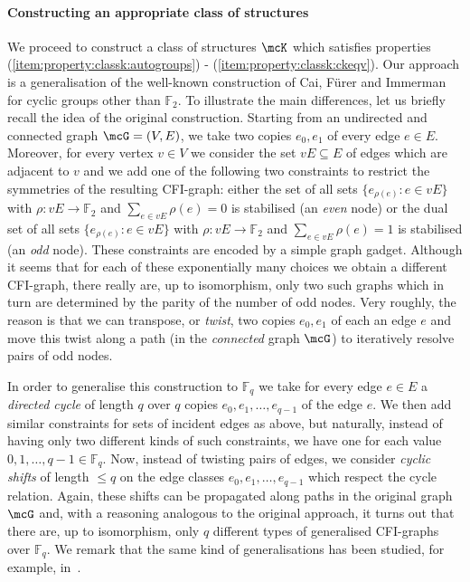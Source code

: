 \documentclass[a4paper,UKenglish]{lipics}
\newcommand{\field}[1]{\mathbb{#1}}
\theoremstyle{plain}
\begin{document}
\paragraph*{Constructing an appropriate class of structures}
We proceed to construct a class of structures $\mcK$ which satisfies 
properties (\ref{item:property:classk:autogroups}) - 
(\ref{item:property:classk:ckeqv}).
Our approach is a generalisation of the well-known construction of Cai, Fürer 
and Immerman~\cite{CFI92} for cyclic groups other than $\field F_2$. 
To illustrate the main differences, let us briefly recall the idea of the 
original construction. Starting from an undirected and connected graph 
$\mcG=(V,E)$, we take two copies $e_0, e_1$ of every edge $e \in E$.
Moreover, for every vertex $v \in V$ we consider the set $vE \subseteq E$ of 
edges which are adjacent to $v$ and we add one of the following two constraints 
to restrict the symmetries of the resulting CFI-graph: either the set of all 
sets $\{ 
e_{\rho(e)} : e \in vE\}$ with $\rho: vE 
\to \field F_2$ and $\sum_{e \in vE} \rho(e) = 0$ is stabilised (an \emph{even} 
node) or the dual set of all sets $\{ e_{\rho(e)} : e  \in vE\}$ with 
$\rho: vE \to \field F_2$ and $\sum_{e \in vE} \rho(e) = 1$ is stabilised (an 
\emph{odd} node).
These constraints are encoded by a simple graph gadget.
Although it seems that for each of these exponentially many choices we obtain a 
different CFI-graph, there really are, up to isomorphism, only two such graphs
which in turn are determined by the parity of the number of odd nodes.
Very roughly, the reason is that we can transpose, or \emph{twist}, two 
copies $e_0, e_1$ of each an edge $e$ and move this twist along a path (in the 
\emph{connected} graph $\mcG$) to iteratively resolve pairs of odd nodes.


In order to generalise this construction to $\field F_q$ we take for 
every edge $e \in E$ a \emph{directed cycle} of length $q$ over $q$ copies 
$e_0, e_1, \dots, e_{q-1}$ of the edge $e$.
We then add similar constraints for sets of incident edges as above, but 
naturally, instead of having only two different kinds of such constraints, we 
have one for each value $0, 1, \dots, q-1 \in \field F_q$.
Now, instead of twisting pairs of edges, we consider 
\emph{cyclic shifts} of length $\leq q$ on the edge classes $e_0, e_1, \dots, 
e_{q-1}$ which respect the cycle relation. Again, these shifts can be 
propagated along paths in the original graph $\mcG$ and, with a reasoning 
analogous to the original approach, it turns out that there are, up to 
isomorphism, only $q$ different types of generalised CFI-graphs over $\field 
F_q$. We remark that the same kind of generalisations has been studied, 
for example, in~\cite{Ho10,To04}.
\end{document}
